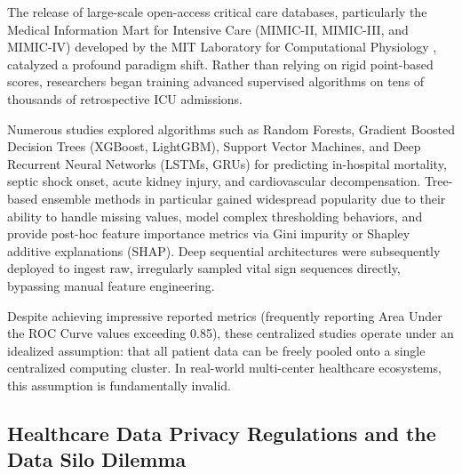 \documentclass[12pt,a4paper,oneside]{report}
\begin{document}
The release of large-scale open-access critical care databases, particularly the Medical Information Mart for Intensive Care (MIMIC-II, MIMIC-III, and MIMIC-IV) developed by the MIT Laboratory for Computational Physiology \citep{johnson2023mimic, goldberger2000physiobank}, catalyzed a profound paradigm shift. Rather than relying on rigid point-based scores, researchers began training advanced supervised algorithms on tens of thousands of retrospective ICU admissions.

Numerous studies explored algorithms such as Random Forests, Gradient Boosted Decision Trees (XGBoost, LightGBM), Support Vector Machines, and Deep Recurrent Neural Networks (LSTMs, GRUs) for predicting in-hospital mortality, septic shock onset, acute kidney injury, and cardiovascular decompensation. Tree-based ensemble methods in particular gained widespread popularity due to their ability to handle missing values, model complex thresholding behaviors, and provide post-hoc feature importance metrics via Gini impurity or Shapley additive explanations (SHAP). Deep sequential architectures were subsequently deployed to ingest raw, irregularly sampled vital sign sequences directly, bypassing manual feature engineering.

Despite achieving impressive reported metrics (frequently reporting Area Under the ROC Curve values exceeding 0.85), these centralized studies operate under an idealized assumption: that all patient data can be freely pooled onto a single centralized computing cluster. In real-world multi-center healthcare ecosystems, this assumption is fundamentally invalid.

\subsection{Healthcare Data Privacy Regulations and the Data Silo Dilemma}
\label{subsec:privacy_regulations}
\end{document}
